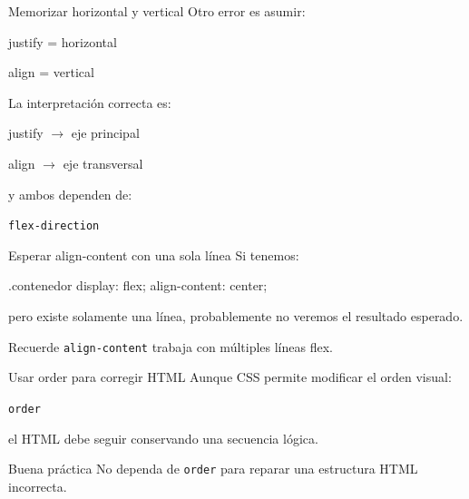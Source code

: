 \documentclass[aspectratio=169,11.5pt]{beamer}
\begin{document}
    \begin{frame}{Memorizar horizontal y vertical}
        Otro error es asumir:

        \begin{center}
            justify = horizontal

            align = vertical
        \end{center}

        La interpretación correcta es:

        \begin{center}
            justify $\rightarrow$ eje principal

            align $\rightarrow$ eje transversal
        \end{center}

        y ambos dependen de:

        \begin{center}
            \texttt{flex-direction}
        \end{center}
    \end{frame}

    \begin{frame}[fragile]{Esperar align-content con una sola línea}
        Si tenemos:

        \begin{csscodedark}
            .contenedor {
                display: flex;
                align-content: center;
            }
        \end{csscodedark}

        pero existe solamente una línea,
        probablemente no veremos el resultado esperado.

        \begin{block}{Recuerde}
            \texttt{align-content} trabaja
            con múltiples líneas flex.
        \end{block}
    \end{frame}

    \begin{frame}{Usar order para corregir HTML}
        Aunque CSS permite modificar
        el orden visual:

        \begin{center}
            \texttt{order}
        \end{center}

        el HTML debe seguir conservando
        una secuencia lógica.

        \begin{alertblock}{Buena práctica}
            No dependa de \texttt{order}
            para reparar una estructura HTML incorrecta.
        \end{alertblock}
    \end{frame}
\end{document}
